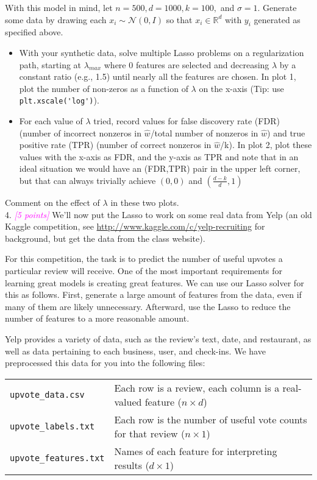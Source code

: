 \documentclass{article}
\newcommand{\field}[1]{\mathbb{#1}}
\newcommand{\1}{\mathbf{1}}
\newcommand{\R}{\field{R}} %
\newcommand{\grade}[1]{\small\textcolor{magenta}{\emph{[#1 points]}} \normalsize}
\begin{document}
With this model in mind, let $n = 500, d = 1000, k = 100,$ and $\sigma = 1$.  Generate some data by drawing each $x_i \sim \mathcal{N}(0, I)$ so that $x_i \in \R^d$ with $y_i$ generated as specified above.
  \begin{itemize}
    \item  With your synthetic data, solve multiple Lasso problems on a regularization path, starting at $\lambda_{max}$ where $0$ features are selected and
  decreasing $\lambda$ by a constant ratio (e.g., 1.5) until nearly all the features are chosen.  
  In plot 1, plot the number of non-zeros as a function of $\lambda$ on the x-axis (Tip: use \verb|plt.xscale('log')|).
  \item  For each value of $\lambda$ tried, record values for false discovery rate (FDR) (number of incorrect nonzeros in $\widehat{w}$/total number of nonzeros in $\widehat{w}$) and true positive rate (TPR)
  (number of correct nonzeros in $\widehat{w}$/k).
  In plot 2, plot these values with the x-axis as FDR, and the y-axis as TPR and note that in an ideal situation we would have an (FDR,TPR) pair in the upper left corner, but that can always trivially achieve $(0,0)$ and $(\tfrac{d-k}{d},1)$ 
\end{itemize}      
  Comment on the effect of $\lambda$ in these two plots.\\

4. \grade{5} We'll now put the Lasso to work on some real data from Yelp (an old Kaggle competition, see \url{http://www.kaggle.com/c/yelp-recruiting} for background, but get the data from the class website).

For this competition, the task is to predict the number of useful upvotes a particular review will receive. 
One of the most important requirements for learning great models is creating great features.  
We can use our Lasso solver for this as follows.  First, generate a large amount of features from the data, even if many of them are likely unnecessary.  Afterward, use the Lasso to reduce the number of features to a more reasonable amount. 

Yelp provides a variety of data, such as the review's text, date, and restaurant, 
as well as data pertaining to each business, user, and check-ins.  We have preprocessed this data for you into the following files:

\begin{center}
\begin{tabular}{l l}
\texttt{upvote\_data.csv} & Each row is a review, each column is a real-valued feature ($ n\times d$)  \\
\texttt{upvote\_labels.txt} &  Each row is the number of useful vote counts for that review ($n \times 1$)\\
\texttt{upvote\_features.txt} & Names of each feature for interpreting results ($d\times 1$)
\end{tabular}
\end{center}
\end{document}
